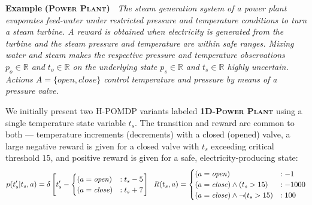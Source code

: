 \documentclass{article} %
\newcommand{\open}{\mathit{open}}
\newcommand{\close}{\mathit{close}}
\begin{document}
\textbf{Example} \textsc{\bf (Power Plant)~\cite{steam2}} \emph{The steam
generation system of a power plant evaporates feed-water under restricted 
pressure and temperature conditions to turn a steam turbine.
A reward is obtained when electricity is generated from the turbine 
and the steam pressure and temperature are within safe ranges.
Mixing water and steam makes the
respective pressure and temperature observations $p_o \in \mathbb{R}$
and $t_o \in \mathbb{R}$ on the underlying state $p_s \in \mathbb{R}$
and $t_s \in \mathbb{R}$ highly uncertain.  Actions $A = \{ \open, \close \}$
control temperature and pressure by means of a pressure valve.}

We initially present two H-POMDP variants labeled \textsc{\bf 1D-Power
  Plant} using a single temperature state variable $t_s$.  
The transition and reward are common to both ---
temperature increments (decrements) with a closed (opened) valve, a
large negative reward is given for a closed valve with $t_s$ exceeding
critical threshold $15$, and positive reward is given for a safe, 
electricity-producing state:
{\footnotesize
\vspace{-1mm}
\begin{align}
\label{eq:trans}
p(t_s'|t_s,a)= \delta\left[ t_s' - 
\begin{cases}
 (a=\open) &: t_s - 5 \\ 
(a = \close) &: t_s + 7 \\
\end{cases}
\right]
\hspace{2mm}
R(t_s,a) = 
\begin{cases}
 (a=\open) &: -1 \\
(a = \close)\wedge (t_s>15) &: -1000 \\
(a = \close)\wedge \neg(t_s>15) &: 100 \\
\end{cases} 
\end{align}
\vspace{-4mm}
}
\end{document}
